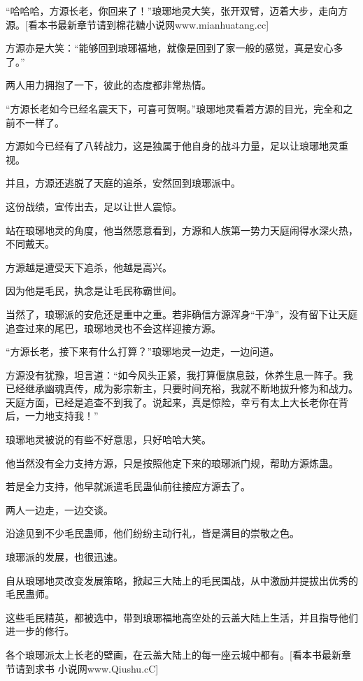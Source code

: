 
\begin{this_body}

“哈哈哈，方源长老，你回来了！”琅琊地灵大笑，张开双臂，迈着大步，走向方源。[看本书最新章节请到棉花糖小说网www.mianhuatang.cc]

方源亦是大笑：“能够回到琅琊福地，就像是回到了家一般的感觉，真是安心多了。”

两人用力拥抱了一下，彼此的态度都非常热情。

“方源长老如今已经名震天下，可喜可贺啊。”琅琊地灵看着方源的目光，完全和之前不一样了。

方源如今已经有了八转战力，这是独属于他自身的战斗力量，足以让琅琊地灵重视。

并且，方源还逃脱了天庭的追杀，安然回到琅琊派中。

这份战绩，宣传出去，足以让世人震惊。

站在琅琊地灵的角度，他当然愿意看到，方源和人族第一势力天庭闹得水深火热，不同戴天。

方源越是遭受天下追杀，他越是高兴。

因为他是毛民，执念是让毛民称霸世间。

当然了，琅琊派的安危还是重中之重。若非确信方源浑身“干净”，没有留下让天庭追查过来的尾巴，琅琊地灵也不会这样迎接方源。

“方源长老，接下来有什么打算？”琅琊地灵一边走，一边问道。

方源没有犹豫，坦言道：“如今风头正紧，我打算偃旗息鼓，休养生息一阵子。我已经继承幽魂真传，成为影宗新主，只要时间充裕，我就不断地拔升修为和战力。天庭方面，已经是追查不到我了。说起来，真是惊险，幸亏有太上大长老你在背后，一力地支持我！”

琅琊地灵被说的有些不好意思，只好哈哈大笑。

他当然没有全力支持方源，只是按照他定下来的琅琊派门规，帮助方源炼蛊。

若是全力支持，他早就派遣毛民蛊仙前往接应方源去了。

两人一边走，一边交谈。

沿途见到不少毛民蛊师，他们纷纷主动行礼，皆是满目的崇敬之色。

琅琊派的发展，也很迅速。

自从琅琊地灵改变发展策略，掀起三大陆上的毛民国战，从中激励并提拔出优秀的毛民蛊师。

这些毛民精英，都被选中，带到琅琊福地高空处的云盖大陆上生活，并且指导他们进一步的修行。

各个琅琊派太上长老的壁画，在云盖大陆上的每一座云城中都有。[看本书最新章节请到求书 小说网www.Qiushu.cC]


\end{this_body}
